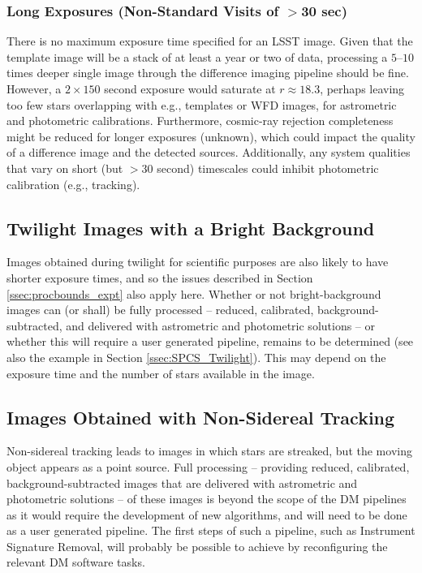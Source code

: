 \subsubsection{Long Exposures (Non-Standard Visits of $>$30 sec)}

There is no maximum exposure time specified for an LSST image.
Given that the template image will be a stack of at least a year or two of data, processing a $5$--$10$ times deeper single image through the difference imaging pipeline should be fine.
However, a $2\times150$ second exposure would saturate at $r \approx 18.3$, perhaps leaving too few stars overlapping with e.g., templates or WFD images, for astrometric and photometric calibrations.
Furthermore, cosmic-ray rejection completeness might be reduced for longer exposures (unknown), which could impact the quality of a difference image and the detected sources.
Additionally, any system qualities that vary on short (but $>30$ second) timescales could inhibit photometric calibration (e.g., tracking).

\subsection{Twilight Images with a Bright Background}

Images obtained during twilight for scientific purposes are also likely to have shorter exposure times, and so the issues described in Section \ref{ssec:procbounds_expt} also apply here.
Whether or not bright-background images can (or shall) be fully processed -- reduced, calibrated, background-subtracted, and delivered with astrometric and photometric solutions -- or whether this will require a user generated pipeline, remains to be determined (see also the example in Section \ref{ssec:SPCS_Twilight}).
This may depend on the exposure time and the number of stars available in the image.

\subsection{Images Obtained with Non-Sidereal Tracking}

Non-sidereal tracking leads to images in which stars are streaked, but the moving object appears as a point source.
Full processing -- providing reduced, calibrated, background-subtracted images that are delivered with astrometric and photometric solutions -- of these images is beyond the scope of the DM pipelines as it would require the development of new algorithms, and will need to be done as a user generated pipeline.
The first steps of such a pipeline, such as Instrument Signature Removal, will probably be possible to achieve by reconfiguring the relevant DM software tasks.


